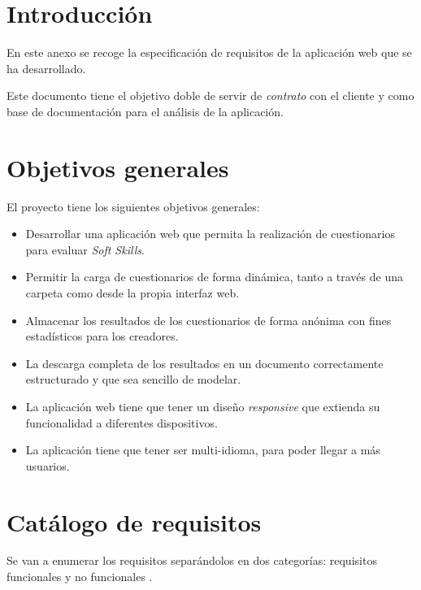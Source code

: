 
\section{Introducción}

En este anexo se recoge la especificación de requisitos de la aplicación web que se ha desarrollado.

Este documento tiene el objetivo doble de servir de \textit{contrato} con el cliente y como base de documentación para el análisis de la aplicación.

\section{Objetivos generales}

El proyecto tiene los siguientes objetivos generales:

\begin{itemize}
	\item Desarrollar una aplicación web que permita la realización de cuestionarios para evaluar \textit{Soft Skills}.
	\item Permitir la carga de cuestionarios de forma dinámica, tanto a través de una carpeta como desde la propia interfaz web.
	\item Almacenar los resultados de los cuestionarios de forma anónima con fines estadísticos para los creadores.
	\item La descarga completa de los resultados en un documento correctamente estructurado y que sea sencillo de modelar.
	\item La aplicación web tiene que tener un diseño \textit{responsive} que extienda su funcionalidad a diferentes dispositivos.
	\item La aplicación tiene que tener ser multi-idioma, para poder llegar a más usuarios.
\end{itemize}

\section{Catálogo de requisitos}

Se van a enumerar los requisitos separándolos en dos categorías: requisitos funcionales y no funcionales \cite{web:requisitos}.

